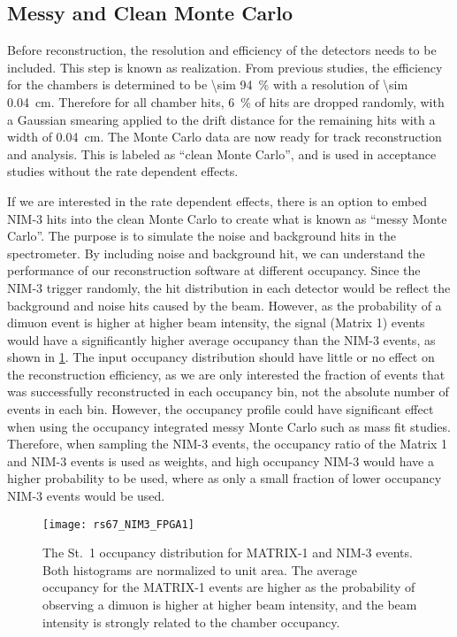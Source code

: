 \documentclass[../main.tex]{subfiles}
\begin{document}
\subsection{Messy and Clean Monte Carlo}
\label{subsec:messyMC}
Before reconstruction, the resolution and efficiency of the detectors needs to be included.
This step is known as realization.
From previous studies, the efficiency for the chambers is determined to be \SI{\sim 94}{\percent}
with a resolution of \SI{\sim 0.04}{\cm}. Therefore for all chamber hits, \SI{6}{\percent} of
hits are dropped randomly, with a Gaussian smearing applied to the drift distance for the remaining
hits with a width of \SI{0.04}{\cm}. The Monte Carlo data are now ready for track reconstruction and analysis.
This is labeled as ``clean Monte Carlo'', and is used in acceptance studies without the
rate dependent effects.

If we are interested in the rate dependent effects, there is an option to embed NIM-3 hits into
the clean Monte Carlo to create what is known as ``messy Monte Carlo''.
The purpose is to simulate the noise and background hits in the spectrometer. By including noise
and background hit, we can understand the performance of our reconstruction software at different
occupancy.
Since the NIM-3 trigger randomly, the hit distribution in each detector would be reflect
the background and noise hits caused by the beam. However, as the probability of a dimuon event
is higher at higher beam intensity, the signal (Matrix 1) events would have a significantly higher
average occupancy than the NIM-3 events, as shown in \cref{fig:NIM3_FPGA1}.
The input occupancy distribution should have little or no
effect on the reconstruction efficiency, as we are only interested the fraction of events that was
successfully reconstructed in each occupancy bin, not the absolute number of events in each bin.
However, the occupancy profile could have significant effect when using the occupancy integrated
messy Monte Carlo such as mass fit studies. Therefore, when sampling the NIM-3 events, the occupancy ratio
of the Matrix 1 and NIM-3 events is used as weights, and high occupancy NIM-3 would have a higher
probability to be used, where as only a small fraction of lower occupancy NIM-3 events would be used.

\begin{figure}[h!]
	\centering
	\texttt{[image: rs67\_NIM3\_FPGA1]}
	\caption{The St.~1 occupancy distribution for MATRIX-1 and NIM-3 events. Both histograms are normalized
		to unit area. The average occupancy for the MATRIX-1 events are higher as the probability of observing
		a dimuon is higher at higher beam intensity, and the beam intensity is strongly related to the chamber
		occupancy.
	}
	\label{fig:NIM3_FPGA1}
\end{figure}
\end{document}
